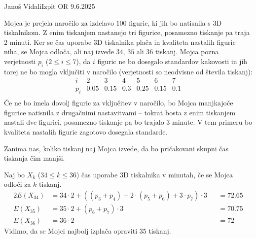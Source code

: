 \begin{naloga}{Janoš Vidali}{Izpit OR 9.6.2025}
\begin{vprasanje}
Mojca je prejela naročilo za izdelavo $100$ figuric,
ki jih bo natisnila s 3D tiskalnikom.
Z enim tiskanjem nastanejo tri figurice,
posamezno tiskanje pa traja $2$ minuti.
Ker se čas uporabe 3D tiskalnika plača in kvaliteta nastalih figuric niha,
se Mojca odloča, ali naj izvede $34$, $35$ ali $36$ tiskanj.
Mojca pozna verjetnosti $p_i$ ($2 \le i \le 7$),
da $i$ figuric ne bo dosegalo standardov kakovosti
in jih torej ne bo mogla vključiti v naročilo
(verjetnosti so neodvisne od števila tiskanj):
$$
\begin{array}{c|cccccc}
	i & 2 & 3 & 4 & 5 & 6 & 7 \\ \hline
	p_i & 0.05 & 0.15 & 0.3 & 0.25 & 0.15 & 0.1 \\
\end{array}
$$
Če ne bo imela dovolj figuric za vključitev v naročilo,
bo Mojca manjkajoče figurice natisnila z drugačnimi nastavitvami
-- tokrat bosta z enim tiskanjem nastali dve figurici,
posamezno tiskanje pa bo trajalo $3$ minute.
V tem primeru bo kvaliteta nastalih figuric zagotovo dosegala standarde.

Zanima nas, koliko tiskanj naj Mojca izvede,
da bo pričakovani skupni čas tiskanja čim manjši.
\end{vprasanje}

\begin{odgovor}
Naj bo $X_k$ ($34 \le k \le 36$) čas uporabe 3D tiskalnika v minutah,
če se Mojca odloči za $k$ tiskanj.
\begin{alignat*}{2}
E(X_{34}) &= 34 \cdot 2 + ((p_3 + p_4) + 2 \cdot (p_5 + p_6) + 3 \cdot p_7) \cdot 3 &&= 72.65 \\
E(X_{35}) &= 35 \cdot 2 + (p_6 + p_7) \cdot 3 &&= 70.75 \\
E(X_{36}) &= 36 \cdot 2 &&= 72
\end{alignat*}
Vidimo, da se Mojci najbolj izplača opraviti $35$ tiskanj.
\end{odgovor}
\end{naloga}
